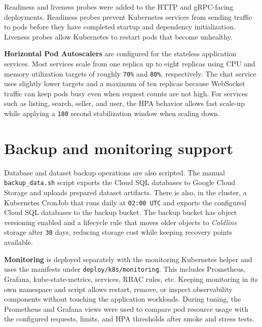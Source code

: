 Readiness and liveness probes were added to the HTTP and gRPC-facing deployments. Readiness probes prevent Kubernetes services from sending traffic to pods before they have completed startup and dependency initialization. Liveness probes allow Kubernetes to restart pods that become unhealthy.

\textbf{Horizontal Pod Autoscalers} are configured for the stateless application services. Most services scale from one replica up to eight replicas using CPU and memory utilization targets of roughly \texttt{70\%} and \texttt{80\%}, respectively. The chat service uses slightly lower targets and a maximum of ten replicas because WebSocket traffic can keep pods busy even when request counts are not high. For services such as listing, search, seller, and user, the HPA behavior allows fast scale-up while applying a \texttt{180} second stabilization window when scaling down.

\section{Backup and monitoring support}

Database and dataset backup operations are also scripted. The manual \texttt{backup\_data.sh} script exports the Cloud SQL databases to Google Cloud Storage and uploads prepared dataset artifacts. There is also, in the cluster, a Kubernetes CronJob that runs daily at \texttt{02:00 UTC} and exports the configured Cloud SQL databases to the backup bucket. The backup bucket has object versioning enabled and a lifecycle rule that moves older objects to \textit{Coldline} storage after \texttt{30} days, reducing storage cost while keeping recovery points available.

\textbf{Monitoring} is deployed separately with the monitoring Kubernetes helper and uses the manifests under \texttt{deploy/k8s/monitoring}. This includes Prometheus, Grafana, kube-state-metrics, services, RBAC rules, etc. Keeping monitoring in its own namespace and script allows restart, remove, or inspect observability components without touching the application workloads. During tuning, the Prometheus and Grafana views were used to compare pod resource usage with the configured requests, limits, and HPA thresholds after smoke and stress tests.
